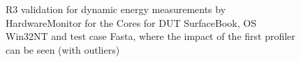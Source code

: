 \begin{figure}
                            \caption{R3 validation for dynamic energy measurements by HardwareMonitor for the Cores for DUT SurfaceBook, OS Win32NT and test case Fasta, where the impact of the first profiler can be seen (with outliers)} \label{fig:SurfaceBook_HardwareMonitor_Cores_R3_dynamic_energy_with_outliers_Win32NT_avg_watts}
                            \end{figure}
                            